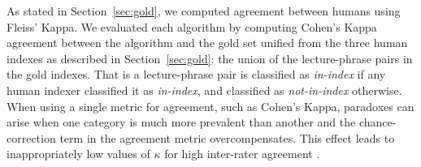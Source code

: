 

As stated in Section~\ref{sec:gold}, we computed agreement between
humans using Fleiss' Kappa. We evaluated each algorithm by computing
Cohen's Kappa agreement between the algorithm and the gold set
unified from the three human indexes as described in
Section~\ref{sec:gold}: the union of the lecture-phrase pairs in the
gold indexes. That is a lecture-phrase pair is classified as {\em
  in-index} if any human indexer classified it as {\em in-index}, and
classified as {\em not-in-index} otherwise. When using a single metric
for agreement, such as Cohen's Kappa, paradoxes can arise when one
category is much more prevalent than another and the chance-correction
term in the agreement metric overcompensates. This effect leads to
inappropriately low values of $\kappa$ for high inter-rater agreement
\cite{feinstein1990high}.

